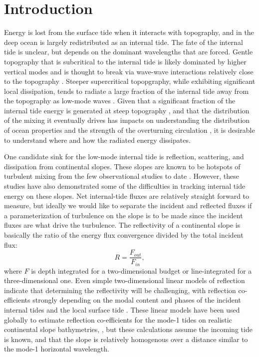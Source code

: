 \documentclass[10pt]{article}
\begin{document}
\section{Introduction}


Energy is lost from the surface tide when it interacts with topography, and in the deep ocean is largely redistributed as an internal tide.  The fate of the internal tide is unclear, but depends on the dominant wavelengths that are forced.  Gentle topography that is subcritical to the internal tide is likely dominated by higher vertical modes and is thought to break via wave-wave interactions relatively close to the topography \citep[i.e.][]{polzin09,stlaurentgarrett02}.  Steeper supercritical topopgraphy, while exhibiting significant local dissipation, tends to radiate a large fraction of the internal tide away from the topography as low-mode waves \citep[i.e. at Hawaii][]{klymaketal06b,carteretal08}.  Given that a significant fraction of the internal tide energy is generated at steep topography \citep{leggklymak08}, and that the distribution of the mixing it eventually drives has impacts on understanding the distribution of ocean properties and the strength of the overturning circulation \citep[i.e.][]{meletetal13}, it is desirable to understand where and how the radiated energy dissipates.

One candidate sink for the low-mode internal tide is reflection, scattering, and dissipation from continental slopes.  These slopes are known to be hotspots of turbulent mixing from the few observational studies to date \citep{nashetal07,klymaketal11a,martinietal13}.  However, these studies have also demonstrated some of the difficulties in tracking internal tide energy on these slopes.  Net internal-tide fluxes are relatively straight forward to measure, but ideally we would like to separate the incident and reflected fluxes if a parameterization of turbulence on the slope is to be made since the incident fluxes are what drive the turbulence.  The reflectivity of a continental slope is basically the ratio of the energy flux convergence divided by the total incident flux: 
$$ R = \frac{F_{out}}{F_{in}}, $$ 
where $F$ is depth integrated for a two-dimensional budget or line-integrated for a three-dimensional one.  Even simple two-dimensional linear models of reflection indicate that determining the reflectivity will be challenging, with reflection co-efficients strongly depending on the modal content and phases of the incident internal tides \citep{klymaketal11a} and the local surface tide \citep{kellynash10}.  These linear models have been used globally to estimate reflection co-efficients for the mode-1 tides on realistic continental slope bathymetries, \citep{kellyetal13,kellyetal13b}, but these calculations assume the incoming tide is known, and that the slope is relatively homogenous over a distance similar to the mode-1 horizontal wavelength.  
\end{document}
